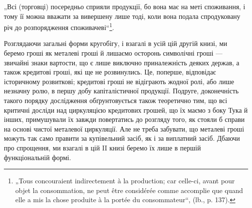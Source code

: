 „Всі (торговці) посередньо сприяли продукції, бо вона має на меті
споживання, і тому її можна вважати за вивершену лише тоді, коли
вона подала спродуковану річ до розпорядження споживачеві“\footnote*{
„Tous concouraient indirectement à la production; car celle-ci, avant pour
objet la consommation, ne peut être considérée comme accomplie que quand elle a
mis la chose produite à la portée du consommateur“, (lb., p. 137).
}.

Розглядаючи загальні форми кругобігу, і взагалі в усій цій другій
книзі, ми беремо гроші як металеві гроші й лишаємо осторонь
символічні гроші — звичайні знаки вартости, що є лише виключно приналежність
деяких держав, а також кредитові гроші, які ще не розвинулись.
Це, поперше, відповідає історичному розвиткові; кредитові гроші
не відіграють жодної ролі, або лише незначну ролю, в першу добу капіталістичної
продукції. Подруге, доконечність такого порядку дослідження
обґрунтовується також теоретично тим, що всі критичні досліди над
циркуляцією кредитових грошей, що їх маємо з боку Тука й інших,
примушували їх завжди повертатись до розгляду того, як стояли б справи
на основі чистої металевої циркуляції. Але не треба забувати, що металеві
гроші можуть так само правити за купівельний засіб, як і за виплатний
засіб. Дбаючи про спрощення, ми взагалі в цій II книзі беремо їх лише
в першій функціональній формі.
